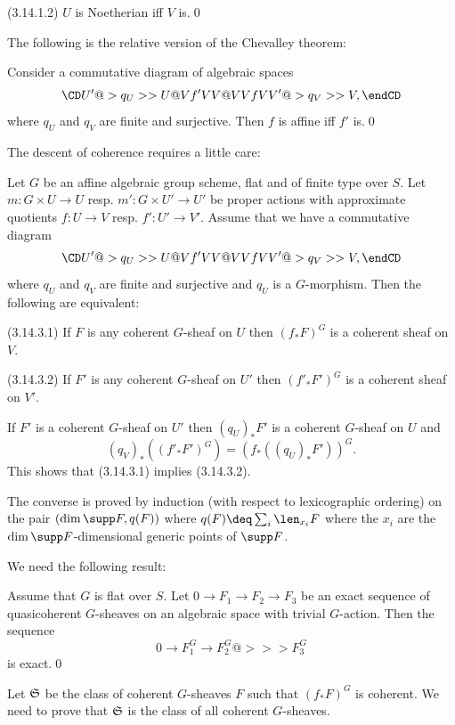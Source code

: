 (3.14.1.2) $U$
is Noetherian  iff $V$ is.\qed
\endproclaim

The following is the relative version of the Chevalley theorem:

 \cite{EGA71, I.7.1.4; Knutson71, p.169} Consider a
commutative
 diagram  of algebraic spaces
$$
\CD
U'@>q_U>> U\\
@Vf'VV @VVfV\\
V'@>q_V>>V,
\endCD
$$
where $q_U$ and $q_V$ are finite and surjective. Then $f$ is affine iff $f'$
is.\qed
\endproclaim



The descent of coherence requires  a little care:

   Let $G$ be an affine algebraic group
scheme, flat and of finite type over $S$. Let
 $m:G\times U\to U$ resp.  $m':G\times U'\to U'$ be  proper actions with
approximate quotients $f:U\to V$ resp. $f':U'\to V'$.
Assume that we have  a commutative
 diagram
$$
\CD
U'@>q_U>> U\\
@Vf'VV @VVfV\\
V'@>q_V>>V,
\endCD
$$
where $q_U$ and $q_V$ are finite and surjective and $q_U$ is a $G$-morphism.
Then the following are equivalent:

(3.14.3.1) If $F$ is any coherent $G$-sheaf on $U$ then $(f_*F)^G$ is a
coherent sheaf on $V$.

(3.14.3.2) If $F'$ is any coherent $G$-sheaf on $U'$ then $(f'_*F')^G$ is
a coherent sheaf on $V'$.
\endproclaim

\demop  If $F'$ is a coherent $G$-sheaf on $U'$ then $(q_U)_*F'$ is
a coherent $G$-sheaf on $U$ and
$$
(q_V)_*\left((f'_*F')^G\right)=\left(f_*((q_U)_*F')\right)^G.
$$
This shows that (3.14.3.1) implies (3.14.3.2).

The converse is proved by induction (with respect to lexicographic ordering)
on the pair
$(\dim\supp F, q(F))$ where $q(F)\deq \sum_i \len_{x_i}F$ where the $x_i$ are
the $\dim\supp F$-dimensional generic points of $\supp F$.

We need the following result:

 \cite{SGA3, I.5.3; Seshadri77, p.264}
Assume that $G$ is flat over $S$.
Let $0\to
F_1\to F_2\to F_3$ be an exact sequence of quasicoherent $G$-sheaves on an
algebraic space with trivial
$G$-action.  Then the sequence
$$
0\to  F_1^G\to F_2^G@>>> F_3^G
$$
is exact.\qed
\endproclaim

Let $\frak S$ be the class of coherent $G$-sheaves $F$ such that $(f_*F)^G$
is coherent. We need to prove that $\frak S$ is the class of all coherent
$G$-sheaves.


